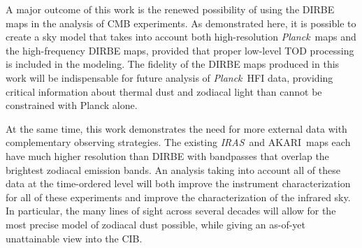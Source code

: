 \documentclass{aa}
\def\Planck{\textit{Planck}}
\def\AKARI{\textrm{{AKARI}}}
\def\IRAS{\textit{{IRAS}}}
\begin{document}
A major outcome of this work is the renewed possibility of using the DIRBE maps in the analysis of CMB experiments. As demonstrated here, it is possible to create a sky model that takes into account both high-resolution \Planck\ maps and the high-frequency DIRBE maps, provided that proper low-level TOD processing is included in the modeling. The fidelity of the DIRBE maps produced in this work will be indispensable for future analysis of \Planck\ HFI data, providing critical information about thermal dust and zodiacal light than cannot be constrained with Planck alone.

At the same time, this work demonstrates the need for more external data with complementary observing strategies. The existing \IRAS\ and \AKARI\ maps each have much higher resolution than DIRBE with bandpasses that overlap the brightest zodiacal emission bands. An analysis taking into account all of these data at the time-ordered level will both improve the instrument characterization for all of these experiments and improve the characterization of the infrared sky. In particular, the many lines of sight across several decades will allow for the most precise model of zodiacal dust possible, while giving an as-of-yet unattainable view into the CIB.
\end{document}
